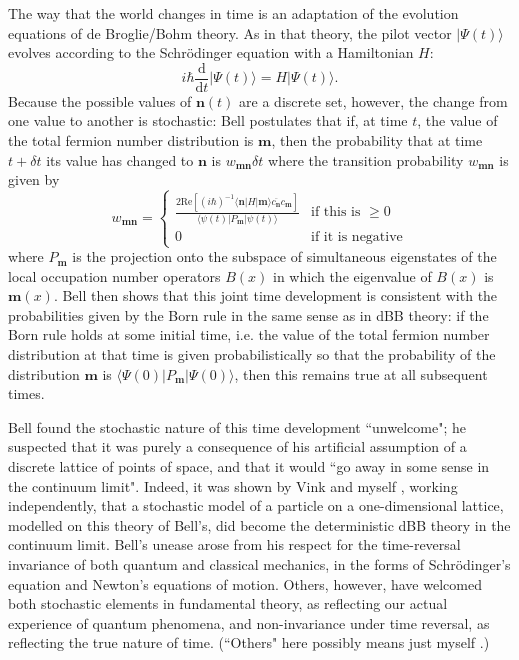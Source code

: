 \documentclass[12pt,a4paper,reqno]{article}
\newcommand{\be}{\begin{equation}}
\newcommand{\ee}{\end{equation}}
\renewcommand{\(}{\left(}
\renewcommand{\)}{\right)}
\renewcommand{\.}{\centerdot}
\renewcommand{\d}{\text{d}}
\newcommand{\m}{\mathbf{m}}
\newcommand{\n}{\mathbf{n}}
\newcommand{\1}{\mathbf{1}}
\newcommand{\<}{\langle}
\renewcommand{\>}{\rangle}
\theoremstyle{definition}
\theoremstyle{remark}
\numberwithin{equation}{section}
\begin{document}
The way that the world changes in time is an adaptation of the evolution equations of de Broglie/Bohm theory. As in that theory, the pilot vector $|\Psi(t)\>$ evolves according to the Schr\"odinger equation with a Hamiltonian $H$:
\[
i\hbar\frac{\d}{\d t}|\Psi(t)\> = H|\Psi(t)\>.
\]
Because the possible values of $\n(t)$ are a discrete set, however, the change from one value to another is stochastic: Bell postulates that if, at time $t$, the value of the total fermion number distribution is $\m$, then the probability that at time $t + \delta t$ its value has changed to $\n$ is $w_{\m\n}\delta t$ where the transition probability $w_{\m\n}$ is given by
\be\label{Bell}
w_{\m\n} = \begin{cases} \frac{2\text{Re}[(i\hbar)^{-1}\<\n|H|\m\>\overline{c_\n}c_\m]}{\<\psi(t)|P_\m|\psi(t)\>} &\text{if this is } \ge 0\\
                       0                                                  &\text{if it is negative}
         \end{cases}
\ee 
where $P_\m$ is the projection onto the subspace of simultaneous eigenstates of the local occupation number operators $B(x)$ in which the eigenvalue of $B(x)$ is $\m(x)$. Bell then shows that this joint time development is consistent with the probabilities given by the Born rule in the same sense as in dBB theory: if the Born rule holds at some initial time, i.e. the value of the total fermion number distribution at that time is given probabilistically so that the probability of the distribution $\m$ is $\<\Psi(0)|P_\m|\Psi(0)\>$, then this remains true at all subsequent times.

Bell found the stochastic nature of this time development ``unwelcome"; he suspected that it was purely a consequence of his artificial assumption of a discrete lattice of points of space, and that it would ``go away in some sense in the continuum limit". Indeed, it was shown by Vink \cite{Vink} and myself \cite{determlimit}, working independently, that a stochastic model of a particle on a one-dimensional lattice, modelled on this theory of Bell's, did become the deterministic dBB theory in the continuum limit. Bell's unease arose from his respect for the time-reversal invariance of both quantum and classical mechanics, in the forms of Schr\"odinger's equation and Newton's equations of motion. Others, however, have welcomed both stochastic elements in fundamental theory, as reflecting our actual experience of quantum phenomena, and non-invariance under time reversal, as reflecting the true nature of time. (``Others" here possibly means just myself \cite{verdammte}.)
\end{document}
